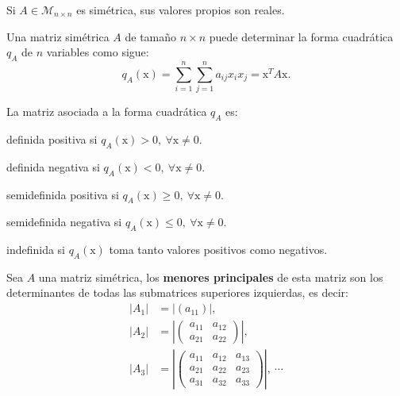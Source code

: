 \documentclass[8pt,a4paper]{extarticle}
\begin{document}
\begin{multicols}{3}
	\begin{boxtheo}[]
		Si $A \in \mathcal{M}_{n \times n}$ es simétrica, sus valores propios son reales.
	\end{boxtheo}

	\begin{boxtheo}[]
		Una matriz simétrica $A$ de tamaño $n \times n$ puede determinar la forma cuadrática $q_A$ de $n$ variables como sigue:
		\[
			q_A (\mathrm{x}) = \sum_{i = 1}^n \sum_{j = 1}^n a_{ij}x_ix_j = \mathrm{x}^T A \mathrm{x}
			.\]
	\end{boxtheo}

	\begin{boxcor}
		La matriz asociada a la forma cuadrática $q_A$ es:
		\begin{eqlist}
			\item definida positiva si $q_A(\mathrm{x}) > 0,\ \forall \mathrm{x} \neq 0$.
			\item definida negativa si $q_A(\mathrm{x}) < 0,\ \forall \mathrm{x} \neq 0$.
			\item semidefinida positiva si $q_A(\mathrm{x}) \ge 0,\ \forall \mathrm{x} \neq 0$.
			\item semidefinida negativa si $q_A(\mathrm{x}) \le 0,\ \forall \mathrm{x} \neq 0$.
			\item indefinida si $q_A(\mathrm{x})$ toma tanto valores positivos como negativos.
		\end{eqlist}
	\end{boxcor}

	\begin{boxdef}
		Sea $A$ una matriz simétrica, los \textbf{menores principales} de esta matriz son los determinantes de todas las submatrices superiores izquierdas, es decir:
		\begin{align*}
			\left| A_1 \right| & = \left| (a_{11}) \right|,                            \\
			\left| A_2 \right| & = \left| \begin{pmatrix} a_{11} & a_{12} \\ a_{21} & a_{22} \end{pmatrix}  \right|,         \\
			\left| A_3 \right| & = \left| \begin{pmatrix} a_{11} & a_{12} & a_{13} \\ a_{21} & a_{22} & a_{23} \\ a_{31} & a_{32} & a_{33} \end{pmatrix}  \right|,\ \cdots
		\end{align*}
	\end{boxdef}


\end{multicols}
\end{document}

